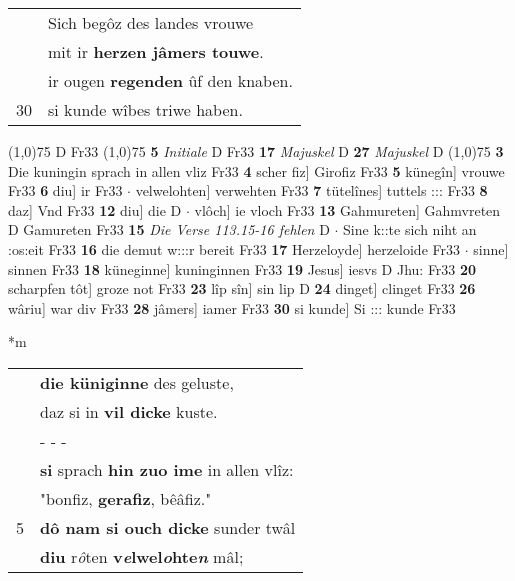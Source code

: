 \documentclass[8pt,a4paper,notitlepage]{article}
\begin{document}
\begin{table}[ht]
\begin{minipage}[t]{0.5\linewidth}
\begin{tabular}{rl}
 & Sich begôz des landes vrouwe\\ 
 & mit ir \textbf{herzen jâmers touwe}.\\ 
 & ir ougen \textbf{regenden} ûf den knaben.\\ 
30 & si kunde wîbes triwe haben.\\ 
\end{tabular}
\scriptsize
\line(1,0){75} \newline
D Fr33 \newline
\line(1,0){75} \newline
\textbf{5} \textit{Initiale} D Fr33  \textbf{17} \textit{Majuskel} D  \textbf{27} \textit{Majuskel} D  \newline
\line(1,0){75} \newline
\textbf{3} Die kuningin sprach in allen vliz Fr33 \textbf{4} scher fiz] Girofiz Fr33 \textbf{5} künegîn] vrouwe Fr33 \textbf{6} diu] ir Fr33  $\cdot$ velwelohten] verwehten Fr33 \textbf{7} tütelînes] tuttels ::: Fr33 \textbf{8} daz] Vnd Fr33 \textbf{12} diu] die D  $\cdot$ vlôch] ie vloch Fr33 \textbf{13} Gahmureten] Gahmvreten D Gamureten Fr33 \textbf{15} \textit{Die Verse 113.15-16 fehlen} D   $\cdot$ Sine k::te sich niht an :os:eit Fr33 \textbf{16} die demut w:::r bereit Fr33 \textbf{17} Herzeloyde] herzeloide Fr33  $\cdot$ sinne] sinnen Fr33 \textbf{18} küneginne] kuninginnen Fr33 \textbf{19} Jesus] iesvs D Jhu: Fr33 \textbf{20} scharpfen tôt] groze not Fr33 \textbf{23} lîp sîn] sin lip D \textbf{24} dinget] clinget Fr33 \textbf{26} wâriu] war div Fr33 \textbf{28} jâmers] iamer Fr33 \textbf{30} si kunde] Si ::: kunde Fr33 \newline
\end{minipage}
\hspace{0.5cm}
\begin{minipage}[t]{0.5\linewidth}
\small
\begin{center}*m
\end{center}
\begin{tabular}{rl}
 & \textbf{die küniginne} des geluste,\\ 
 & daz si in \textbf{vil dicke} kuste.\\ 
 & \multicolumn{1}{l}{ - - - }\\ 
 & \textbf{si} sprach \textbf{hin zuo ime} in allen vlîz:\\ 
 & "bonfiz, \textbf{gerafiz}, bêâfiz."\\ 
5 & \textbf{dô nam si ouch dicke} sunder twâl\\ 
 & \textbf{diu} r\textit{ô}ten \textbf{v\textit{e}lwel\textit{o}hte\textit{n}} mâl;\\ 

\end{tabular}
\end{minipage}
\end{table}
\end{document}
